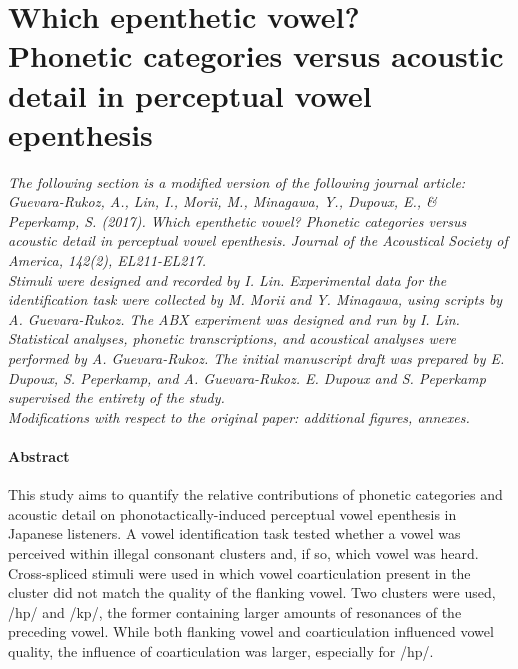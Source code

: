 
\section{Which epenthetic vowel? \\ Phonetic categories versus acoustic detail in perceptual vowel epenthesis} \label{2-ahpa}

\small{\textit{{\color{darkgray}The following section is a modified version of the following journal article: \\
Guevara-Rukoz, A., Lin, I., Morii, M., Minagawa, Y., Dupoux, E., \& Peperkamp, S. (2017). Which epenthetic vowel? Phonetic categories versus acoustic detail in perceptual vowel epenthesis. Journal of the Acoustical Society of America, 142(2), EL211-EL217. \\
Stimuli were designed and recorded by I. Lin.
Experimental data for the identification task were collected by M. Morii and Y. Minagawa, using scripts by A. Guevara-Rukoz. The ABX experiment was designed and run by I. Lin.
Statistical analyses, phonetic transcriptions, and acoustical analyses were performed by A. Guevara-Rukoz.
The initial manuscript draft was prepared by E. Dupoux, S. Peperkamp, and A. Guevara-Rukoz.
E. Dupoux and S. Peperkamp supervised the entirety of the study.\\
Modifications with respect to the original paper: additional figures, annexes.\\}}}
\paragraph{Abstract}

This study aims to quantify the relative contributions of phonetic categories and acoustic detail on phonotactically-induced perceptual vowel epenthesis in Japanese listeners. A vowel identification task tested whether a vowel was perceived within illegal consonant clusters and, if so, which vowel was heard. Cross-spliced stimuli were used in which vowel coarticulation present in the cluster did not match the quality of the flanking vowel. Two clusters were used, /hp/ and /kp/, the former containing larger amounts of resonances of the preceding vowel. While both flanking vowel and coarticulation influenced vowel quality, the influence of coarticulation was larger, especially for /hp/.

